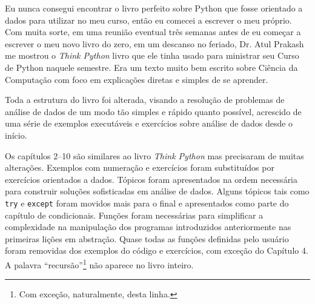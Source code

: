 Eu nunca consegui encontrar o livro perfeito sobre Python que fosse orientado a dados
para utilizar no meu curso, então eu comecei a escrever o meu próprio. Com muita sorte, em 
uma reunião eventual três semanas antes de eu começar a escrever o meu novo livro do zero, 
em um descanso no feriado, Dr. Atul Prakash me mostrou o \emph{Think Python} livro que ele tinha
usado para ministrar seu Curso de Python naquele semestre.
Era um texto muito bem escrito sobre Ciência da Computação com foco em
explicações diretas e simples de se aprender.

Toda a estrutura do livro foi alterada, visando a resolução de problemas de análise de 
dados de um modo tão simples e rápido quanto possível, acrescido de uma série de exemplos 
executáveis e exercícios sobre análise de dados desde o início.

Os capítulos 2--10 são similares ao livro \emph{Think Python}
mas precisaram de muitas alterações. Exemplos com numeração e
exercícios foram substituídos por exercícios orientados a dados.
Tópicos foram apresentados na ordem necessária para construir
soluções sofisticadas em análise de dados. Alguns tópicos tais como {\tt try}
e {\tt except} foram movidos mais para o final e apresentados como parte do
capítulo de condicionais. Funções foram necessárias para simplificar
a complexidade na manipulação dos programas introduzidos anteriormente
nas primeiras lições em abstração. Quase todas as funções definidas pelo usuário
foram removidas dos exemplos do código e exercícios, com exceção do Capítulo 4.
A palavra ``recursão''\footnote{Com exceção, naturalmente, desta linha.}
não aparece no livro inteiro.

